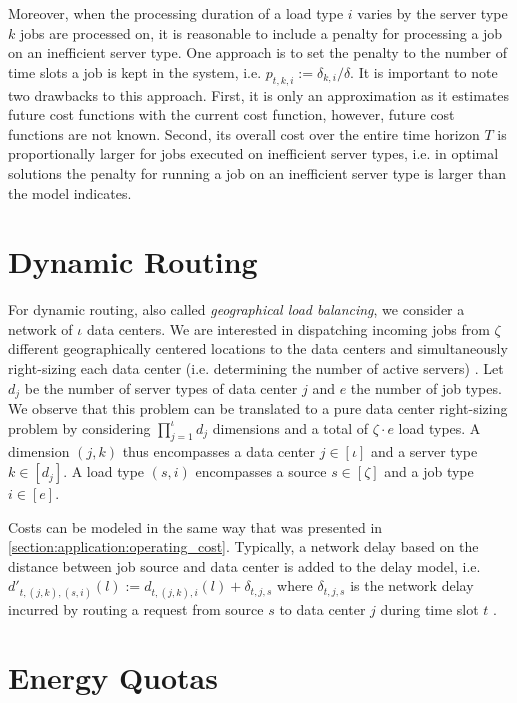 Moreover, when the processing duration of a load type $i$ varies by the server type $k$ jobs are processed on, it is reasonable to include a penalty for processing a job on an inefficient server type. One approach is to set the penalty to the number of time slots a job is kept in the system, i.e. $p_{t,k,i} := \delta_{k,i} / \delta$. It is important to note two drawbacks to this approach. First, it is only an approximation as it estimates future cost functions with the current cost function, however, future cost functions are not known. Second, its overall cost over the entire time horizon $T$ is proportionally larger for jobs executed on inefficient server types, i.e. in optimal solutions the penalty for running a job on an inefficient server type is larger than the model indicates.

\section{Dynamic Routing}\label{section:application:dynamic_routing}

For dynamic routing, also called \emph{geographical load balancing}, we consider a network of $\iota$ data centers. We are interested in dispatching incoming jobs from $\zeta$ different geographically centered locations to the data centers and simultaneously right-sizing each data center (i.e. determining the number of active servers) \cite{Lin2012}. Let $d_j$ be the number of server types of data center $j$ and $e$ the number of job types. We observe that this problem can be translated to a pure data center right-sizing problem by considering $\prod_{j=1}^{\iota} d_j$ dimensions and a total of $\zeta \cdot e$ load types. A dimension $(j,k)$ thus encompasses a data center $j \in [\iota]$ and a server type $k \in [d_j]$. A load type $(s,i)$ encompasses a source $s \in [\zeta]$ and a job type $i \in [e]$.

Costs can be modeled in the same way that was presented in \autoref{section:application:operating_cost}. Typically, a network delay based on the distance between job source and data center is added to the delay model, i.e. $d'_{t,(j,k),(s,i)}(l) := d_{t,(j,k),i}(l) + \delta_{t,j,s}$ where $\delta_{t,j,s}$ is the network delay incurred by routing a request from source $s$ to data center $j$ during time slot $t$ \cite{Lin2012}.

\section{Energy Quotas}\label{section:application:energy_quotas}

